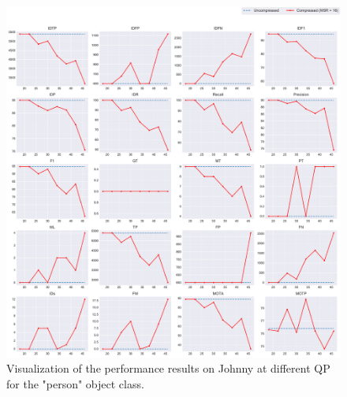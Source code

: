 \begin{figure}[!tb]
  \centering
  \includegraphics[width=1.0\linewidth]{img/Johnny_0_multiplots_qp.pdf}
  \caption[Visualization of the performance results on Johnny at different QP for the "person" object class]
  {
  Visualization of the performance results on Johnny at different QP for the "person" object class.
  }
  \label{fig:Johnny_0_multiplots_qp}
\end{figure}